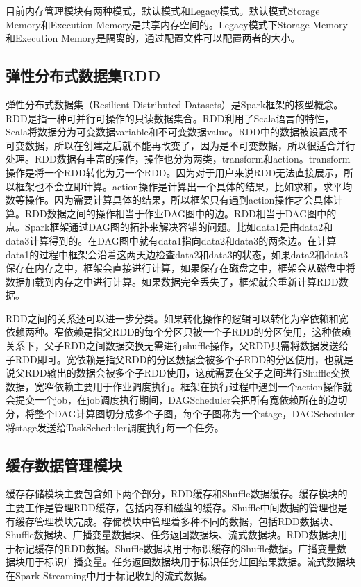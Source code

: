 目前内存管理模块有两种模式，默认模式和Legacy模式。默认模式Storage Memory和Execution Memory是共享内存空间的。Legacy模式下Storage Memory和Execution Memory是隔离的，通过配置文件可以配置两者的大小。

\subsection{弹性分布式数据集RDD}

弹性分布式数据集（Resilient Distributed Datasets）是Spark框架的核型概念。RDD是指一种可并行可操作的只读数据集合。RDD利用了Scala语言的特性，Scala将数据分为可变数据variable和不可变数据value。RDD中的数据被设置成不可变数据，所以在创建之后就不能再改变了，因为是不可变数据，所以很适合并行处理。RDD数据有丰富的操作，操作也分为两类，transform和action。transform操作是将一个RDD转化为另一个RDD。因为对于用户来说RDD无法直接展示，所以框架也不会立即计算。action操作是计算出一个具体的结果，比如求和，求平均数等操作。因为需要计算具体的结果，所以框架只有遇到action操作才会具体计算。RDD数据之间的操作相当于作业DAG图中的边。RDD相当于DAG图中的点。Spark框架通过DAG图的拓扑来解决容错的问题。比如data1是由data2和data3计算得到的。在DAG图中就有data1指向data2和data3的两条边。在计算data1的过程中框架会沿着这两天边检查data2和data3的状态，如果data2和data3保存在内存之中，框架会直接进行计算，如果保存在磁盘之中，框架会从磁盘中将数据加载到内存之中进行计算。如果数据完全丢失了，框架就会重新计算RDD数据。

RDD之间的关系还可以进一步分类。如果转化操作的逻辑可以转化为窄依赖和宽依赖两种。窄依赖是指父RDD的每个分区只被一个子RDD的分区使用，这种依赖关系下，父子RDD之间数据交换无需进行shuffle操作，父RDD只需将数据发送给子RDD即可。宽依赖是指父RDD的分区数据会被多个子RDD的分区使用，也就是说父RDD输出的数据会被多个子RDD使用，这就需要在父子之间进行Shuffle交换数据，宽窄依赖主要用于作业调度执行。框架在执行过程中遇到一个action操作就会提交一个job，在job调度执行期间，DAGScheduler会把所有宽依赖所在的边切分，将整个DAG计算图切分成多个子图，每个子图称为一个stage，DAGScheduler将stage发送给TaskScheduler调度执行每一个任务。

\subsection{缓存数据管理模块}

缓存存储模块主要包含如下两个部分，RDD缓存和Shuffle数据缓存。缓存模块的主要工作是管理RDD缓存，包括内存和磁盘的缓存。Shuffle中间数据的管理也是有缓存管理模块完成。存储模块中管理着多种不同的数据，包括RDD数据块、Shuffle数据块、广播变量数据块、任务返回数据块、流式数据块。RDD数据块用于标记缓存的RDD数据。Shuffle数据块用于标识缓存的Shuffle数据。广播变量数据块用于标识广播变量。任务返回数据块用于标识任务赶回结果数据。流式数据块在Spark Streaming中用于标记收到的流式数据。


